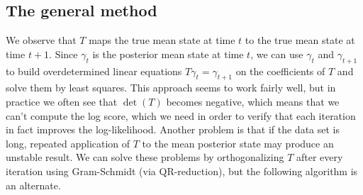 \documentclass[12pt,leqno]{article}
\begin{document}
\subsection{The general method} We observe that $T$ maps the true mean state at time $t$ to the true mean state at
time $t+1$.  Since $\gamma_t$ is the posterior mean state at time $t$, we can use $\gamma_t$ and
$\gamma_{t+1}$ to build overdetermined linear equations $T\gamma_t = \gamma_{t+1}$ on the coefficients of $T$
and solve them by least squares.
This approach seems to work fairly well, but in practice we often see that $\det(T)$ becomes negative,
which means that we can't compute the log score, which we need in order to verify that each iteration in fact
improves the log-likelihood.  Another problem is that if the data set is long, repeated application of $T$ to the
mean posterior state may produce an unstable result.  We can solve these problems by orthogonalizing $T$
after every iteration using Gram-Schmidt (via QR-reduction), but the following algorithm is an alternate.
\end{document}
